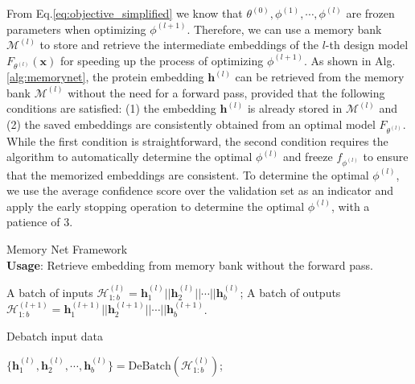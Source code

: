 \documentclass{article}
\newcommand\NoThen{\renewcommand\algorithmicthen{}}
\newcommand\NoDo{\renewcommand\algorithmicdo{}}
\begin{document}
\begin{minipage}{\linewidth}
    \begin{minipage}{0.5\linewidth}
        From Eq.\ref{eq:objective_simplified} we know that $\theta^{(0)}, \phi^{(1)}, \cdots, \phi^{(l)}$ are frozen parameters when optimizing $\phi^{(l+1)}$. Therefore, we can use a memory bank $\mathcal{M}^{(l)}$ to store and retrieve the intermediate embeddings of the $l$-th design model $F_{\theta^{(l)}}(\boldsymbol{x})$ for speeding up the process of optimizing $\phi^{(l+1)}$. As shown in Alg.\ref{alg:memorynet}, the protein embedding $\boldsymbol{h}^{(l)}$ can be retrieved from the memory bank $\mathcal{M}^{(l)}$ without the need for a forward pass, provided that the following conditions are satisfied: (1) the embedding $\boldsymbol{h}^{(l)}$ is already stored in $\mathcal{M}^{(l)}$ and (2) the saved embeddings are consistently obtained from an optimal model $F_{\theta^{(l)}}$. While the first condition is straightforward, the second condition requires the algorithm to automatically determine the optimal $\phi^{(l)}$ and freeze $f_{\phi^{(l)}}$ to ensure that the memorized embeddings are consistent. To determine the optimal $\phi^{(l)}$, we use the average confidence score over the validation set as an indicator and apply the early stopping operation to determine the optimal $\phi^{(l)}$, with a patience of 3. 
        

    \end{minipage}
    \hspace{0.00\linewidth}
    \begin{minipage}{0.5\linewidth}
        \begin{algorithm}[H]
            \caption{Memory Net Framework 
            \\\textbf{Usage}: Retrieve embedding from memory bank without the forward pass.}
            \label{alg:memorynet}
            \begin{small}
            \begin{algorithmic}[1]
                \Require A batch of inputs $\mathcal{H}_{1:b}^{(l)} = \boldsymbol{h}_1^{(l)}|| \boldsymbol{h}_2^{(l)}|| \cdots || \boldsymbol{h}_b^{(l)}$; 
                \Ensure A batch of outputs $\mathcal{H}_{1:b}^{(l+1)} = \boldsymbol{h}_1^{(l+1)} || \boldsymbol{h}_2^{(l+1)} || \cdots || \boldsymbol{h}_b^{(l+1)}$.
                \NoDo
                \NoThen
        
                 Debatch input data
        
                \State $\{\boldsymbol{h}_1^{(l)}, \boldsymbol{h}_2^{(l)}, \cdots, \boldsymbol{h}_b^{(l)}\} = \text{DeBatch}(\mathcal{H}_{1:b}^{(l)})$;
        

\end{algorithmic}
\end{small}
\end{algorithm}
\end{minipage}
\end{minipage}
\end{document}
